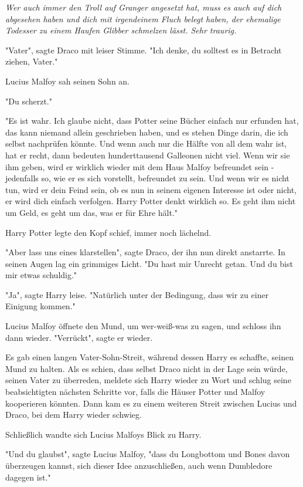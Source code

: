 {\emph{Wer auch immer den Troll auf Granger angesetzt hat, muss es auch auf dich abgesehen haben und dich mit irgendeinem Fluch belegt haben, der ehemalige Todesser zu einem Haufen Glibber schmelzen lässt. Sehr traurig.}

"Vater", sagte Draco mit leiser Stimme. "Ich denke, du solltest es in Betracht ziehen, Vater."

Lucius Malfoy sah seinen Sohn an.

"Du scherzt."

"Es ist wahr. Ich glaube nicht, dass Potter seine Bücher einfach nur erfunden hat, das kann niemand allein geschrieben haben, und es stehen Dinge darin, die ich selbst nachprüfen könnte. Und wenn auch nur die Hälfte von all dem wahr ist, hat er recht, dann bedeuten hunderttausend Galleonen nicht viel. Wenn wir sie ihm geben, wird er wirklich wieder mit dem Haus Malfoy befreundet sein - jedenfalls so, wie er es sich vorstellt, befreundet zu sein. Und wenn wir es nicht tun, wird er dein Feind sein, ob es nun in seinem eigenen Interesse ist oder nicht, er wird dich einfach verfolgen. Harry Potter denkt wirklich so. Es geht ihm nicht um Geld, es geht um das, was er für Ehre hält."

Harry Potter legte den Kopf schief, immer noch lächelnd.

"Aber lass uns eines klarstellen", sagte Draco, der ihn nun direkt anstarrte. In seinen Augen lag ein grimmiges Licht. "Du hast mir Unrecht getan. Und du bist mir etwas schuldig."

"Ja", sagte Harry leise. "Natürlich unter der Bedingung, dass wir zu einer Einigung kommen."

Lucius Malfoy öffnete den Mund, um wer-weiß-was zu sagen, und schloss ihn dann wieder. "Verrückt", sagte er wieder.

Es gab einen langen Vater-Sohn-Streit, während dessen Harry es schaffte, seinen Mund zu halten. Als es schien, dass selbst Draco nicht in der Lage sein würde, seinen Vater zu überreden, meldete sich Harry wieder zu Wort und schlug seine beabsichtigten nächsten Schritte vor, falls die Häuser Potter und Malfoy kooperieren könnten. Dann kam es zu einem weiteren Streit zwischen Lucius und Draco, bei dem Harry wieder schwieg.

Schließlich wandte sich Lucius Malfoys Blick zu Harry.

"Und du glaubst", sagte Lucius Malfoy, "dass du Longbottom und Bones davon überzeugen kannst, sich dieser Idee anzuschließen, auch wenn Dumbledore dagegen ist."

}
